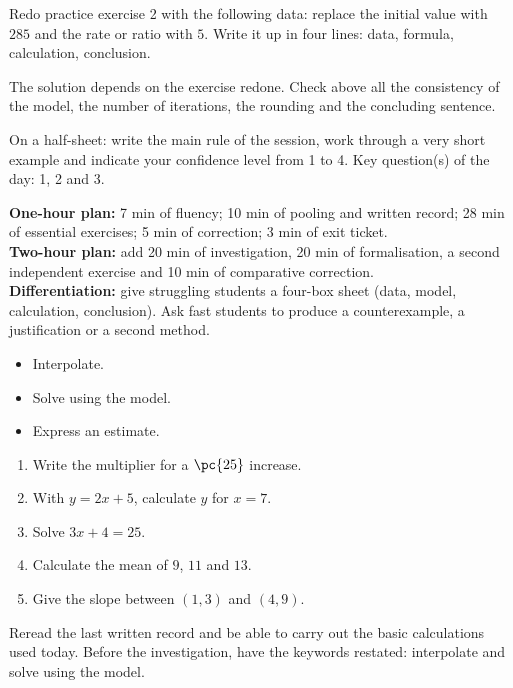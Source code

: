 
\begin{homework}Redo practice exercise 2 with the following data: replace the initial value with $285$ and the rate or ratio with $5$. Write it up in four lines: data, formula, calculation, conclusion.\end{homework}
\begin{solution}The solution depends on the exercise redone. Check above all the consistency of the model, the number of iterations, the rounding and the concluding sentence.\end{solution}

\begin{exitticket}[3 minutes]On a half-sheet: write the main rule of the session, work through a very short example and indicate your confidence level from 1 to 4. Key question(s) of the day: 1, 2 and 3.\end{exitticket}

\ifmxteacher
\begin{method}
\textbf{One-hour plan:} 7 min of fluency; 10 min of pooling and written record; 28 min of essential exercises; 5 min of correction; 3 min of exit ticket.\\
\textbf{Two-hour plan:} add 20 min of investigation, 20 min of formalisation, a second independent exercise and 10 min of comparative correction.\\
\textbf{Differentiation:} give struggling students a four-box sheet (data, model, calculation, conclusion). Ask fast students to produce a counterexample, a justification or a second method.
\end{method}
\fi
{}
\begin{objectives}\begin{itemize}\item Interpolate.\item Solve using the model.\item Express an estimate.\end{itemize}\end{objectives}
\begin{fluency}\begin{enumerate}\item Write the multiplier for a $\pc{25}$ increase. \item With $y=2x+5$, calculate $y$ for $x=7$. \item Solve $3x+4=25$. \item Calculate the mean of $9$, $11$ and $13$. \item Give the slope between $(1,3)$ and $(4,9)$. \end{enumerate}\end{fluency}
\begin{prerequisites}Reread the last written record and be able to carry out the basic calculations used today. Before the investigation, have the keywords restated: interpolate and solve using the model.\end{prerequisites}

